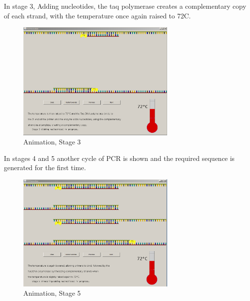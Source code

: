 \begin{frame}
In stage 3, Adding nucleotides, the taq polymerase creates a complementary copy of each strand, with the temperature once again raised to 72\degree C.

\begin{figure}[!t]
  \begin{center}
	\includegraphics[width=0.7\textwidth]{./img/AnimImpl/Stage3.png}
    \caption{
      \label{fig:AnimImpl:stage3}
      Animation, Stage 3
    }
  \end{center}
\end{figure}
\end{frame}

\begin{frame}

In stages 4 and 5 another cycle of PCR is shown and the required sequence is generated for the first time.

\begin{figure}[!t]
  \begin{center}
	\includegraphics[width=0.7\textwidth]{./img/AnimImpl/Stage5.png}
    \caption{
      \label{fig:AnimImpl:stage5}
      Animation, Stage 5
    }
  \end{center}
\end{figure}
\end{frame}


